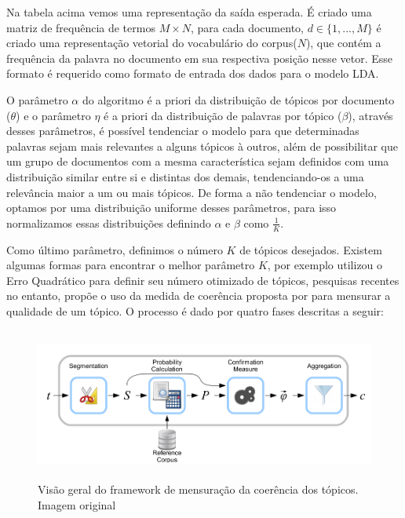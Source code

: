 \documentclass[12pt,a4paper]{article}
\begin{document}
Na tabela acima vemos uma representação da saída esperada. É criado uma matriz de frequência de termos $M \times N$, para cada documento,
 $d \in \{1,. . . , M\}$ é criado uma representação vetorial do vocabulário do corpus($N$), que contém a frequência da palavra no documento em sua respectiva posição nesse vetor.
 Esse formato é requerido como formato de entrada dos dados para o modelo LDA.

O parâmetro $\alpha$ do algoritmo é a priori da distribuição de tópicos por documento ($\theta$) e o parâmetro $\eta$ é a priori da distribuição de palavras por tópico ($\beta$),
 através desses parâmetros, é possível tendenciar o modelo para que determinadas palavras sejam mais relevantes a alguns tópicos à outros,
 além de possibilitar que um grupo de documentos com a mesma característica sejam definidos com uma distribuição similar entre si e distintas dos demais,
 tendenciando-os a uma relevância maior a um ou mais tópicos. De forma a não tendenciar o modelo, optamos por uma distribuição uniforme desses parâmetros,
 para isso normalizamos essas distribuições definindo $\alpha$ e $\beta$ como $\frac{1}{K}$.

Como último parâmetro, definimos o número $K$ de tópicos desejados. Existem algumas formas para encontrar o melhor parâmetro $K$,
  por exemplo utilizou o Erro Quadrático para definir seu número otimizado de tópicos, pesquisas recentes no entanto,
 propõe o uso da medida de coerência proposta por  para mensurar a qualidade de um tópico. O processo é dado por quatro fases descritas a seguir:


\begin{figure}[H]
	\centering
    \includegraphics[height=5cm]{images/figure_3.png}
    \caption{Visão geral do framework de mensuração da coerência dos tópicos. Imagem original }
\end{figure}
\end{document}

